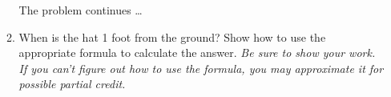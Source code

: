 \documentclass[11pt]{article}
\begin{document}
\begin{enumerate}
\begin{enumerate}
\newpage

\hspace{-.5in}  The problem continues \dots

\item When is the hat 1 foot from the ground?  Show how to use the appropriate formula to calculate the answer.  \emph{Be sure to show your work.  If you can't figure out how to use the formula, you may approximate it for possible partial credit.}
\vfill
\vfill
\end{enumerate}







\end{enumerate}
\end{document}
